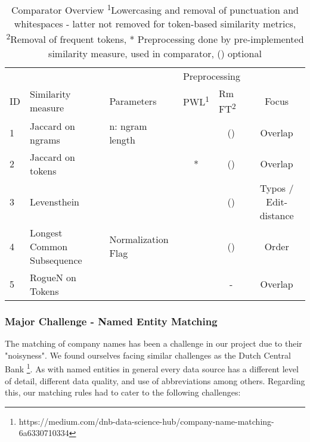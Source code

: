 \documentclass[11pt,titlepage,oneside,openany]{article}
\begin{document}
\begin{table}[t]
	
	
	\begin{tabular}{lllccc}
		& \multicolumn{2}{l}{}                              & \multicolumn{2}{l}{Preprocessing}                   & \\
		ID & Similarity   measure       & Parameters           & \multicolumn{1}{l}{PWL\textsuperscript{1}} & \multicolumn{1}{l}{Rm FT\textsuperscript{2}} & Focus\\
		1  & Jaccard on ngrams          & n: ngram   length    & \checked & (\checked)                     & Overlap\\
		2  & Jaccard on tokens          &                      & *                       & (\checked)                       &Overlap\\
		3  & Levensthein                &                      & \checked & (\checked)                       &Typos / Edit-distance\\
		4  & Longest Common Subsequence & Normalization   Flag & \checked & (\checked)                       & Order\\
		5  & RogueN on Tokens \cite{lin_rouge_2004} & & \checked & -  & Overlap                      
	\end{tabular}

\caption[Comparator Overview]%
{Comparator Overview \small\medspace\medspace \textsuperscript{1}Lowercasing and removal of punctuation and whitespaces -  latter not removed for token-based similarity metrics, \textsuperscript{2}Removal of frequent tokens, * Preprocessing done by pre-implemented similarity measure, \checked \space used in comparator, (\checked) optional}
\label{table:comparators}

\end{table}

\subsubsection{Major Challenge - Named Entity Matching}

The matching of company names has been a challenge in our project due to their "noisyness". We found ourselves facing similar challenges as the Dutch Central Bank \footnote{https://medium.com/dnb-data-science-hub/company-name-matching-6a6330710334}. %
As with named entities in general every data source has a different level of detail, different data quality, and use of abbreviations among others. Regarding this, our matching rules had to cater to the following challenges:
\end{document}
